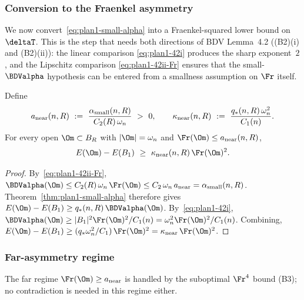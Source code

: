 \subsubsection{Conversion to the Fraenkel asymmetry}
\label{sec:plan1-conversion}

We now convert~\eqref{eq:plan1-small-alpha} into a Fraenkel-squared
lower bound on $\deltaT$. This is the step that needs both directions
of BDV Lemma~4.2 ((B2)(i) and (B2)(ii)): the linear comparison
\eqref{eq:plan1-42i} produces the sharp exponent~$2$, and the Lipschitz
comparison \eqref{eq:plan1-42ii-Fr} ensures that the small-$\BDValpha$
hypothesis can be entered from a smallness assumption on $\Fr$ itself.

\begin{corollary}
\label{cor:plan1-small-Fr}
Define
\begin{equation}\label{eq:plan1-anear}
   a_{\rm near}(n,R)\ :=\
   \frac{\alpha_{\rm small}(n,R)}{C_{2}(R)\,\omega_{n}}\ >\ 0,
   \qquad
   \kappa_{\rm near}(n,R)\ :=\
   \frac{q_{*}(n,R)\,\omega_{n}^{2}}{C_{1}(n)}.
\end{equation}
For every open $\Om\subset B_{R}$ with $|\Om|=\omega_{n}$ and
$\Fr(\Om)\le a_{\rm near}(n,R)$,
\begin{equation}\label{eq:plan1-small-Fr}
   E(\Om)-E(B_{1})\ \ge\ \kappa_{\rm near}(n,R)\,\Fr(\Om)^{2}.
\end{equation}
\end{corollary}

\begin{proof}
By~\eqref{eq:plan1-42ii-Fr},
$\BDValpha(\Om)\le C_{2}(R)\,\omega_{n}\,\Fr(\Om)\le C_{2}\,\omega_{n}\,a_{\rm near}=\alpha_{\rm small}(n,R)$.
Theorem~\ref{thm:plan1-small-alpha} therefore gives
$E(\Om)-E(B_{1})\ge q_{*}(n,R)\,\BDValpha(\Om)$. By~\eqref{eq:plan1-42i},
$\BDValpha(\Om)\ge|B_{1}|^{2}\Fr(\Om)^{2}/C_{1}(n)=\omega_{n}^{2}\Fr(\Om)^{2}/C_{1}(n)$.
Combining,
$E(\Om)-E(B_{1})\ge (q_{*}\omega_{n}^{2}/C_{1})\,\Fr(\Om)^{2}=\kappa_{\rm near}\,\Fr(\Om)^{2}$.
\end{proof}

\subsubsection{Far-asymmetry regime}
\label{sec:plan1-far}

The far regime $\Fr(\Om)\ge a_{\rm near}$ is handled by the suboptimal
$\Fr^{4}$ bound (B3); no contradiction is needed in this regime either.

